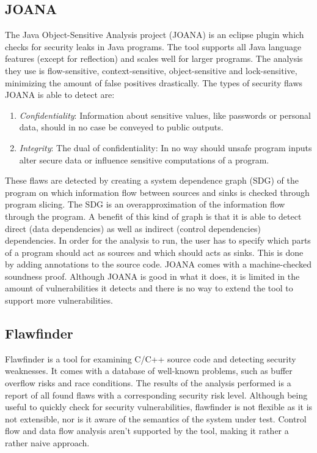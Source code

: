 \subsection*{JOANA}
The Java Object-Sensitive Analysis project (JOANA\cite{JOANA}) is an eclipse plugin which checks for security leaks in Java programs. The tool supports all Java language features (except for reflection) and scales well for larger programs. The analysis they use is flow-sensitive, context-sensitive, object-sensitive and lock-sensitive, minimizing the amount of false positives drastically. The types of security flaws JOANA is able to detect are:
\begin{enumerate}
\item \textit{Confidentiality}: Information about sensitive values, like passwords or personal data, should in no case be conveyed to public outputs.
\item \textit{Integrity}: The dual of confidentiality: In no way should unsafe program inputs alter secure data or influence sensitive computations of a program.
\end{enumerate}
These flaws are detected by creating a system dependence graph (SDG) of the program on which information flow between sources and sinks is checked through program slicing. The SDG is an overapproximation of the information flow through the program. A benefit of this kind of graph is that it is able to detect direct (data dependencies) as well as indirect (control dependencies) dependencies. In order for the analysis to run, the user has to specify which parts of a program should act as sources and which should acts as sinks. This is done by adding annotations to the source code. JOANA comes with a machine-checked soundness proof. Although JOANA is good in what it does, it is limited in the amount of vulnerabilities it detects and there is no way to extend the tool to support more vulnerabilities.

\subsection*{Flawfinder}
Flawfinder\cite{flawfinder} is a tool for examining C/C++ source code and detecting security weaknesses. It comes with a database of well-known problems, such as buffer overflow risks and race conditions. The results of the analysis performed is a report of all found flaws with a corresponding security risk level. Although being useful to quickly check for security vulnerabilities, flawfinder is not flexible as it is not extensible, nor is it aware of the semantics of the system under test. Control flow and data flow analysis aren't supported by the tool, making it rather a rather naive approach.

